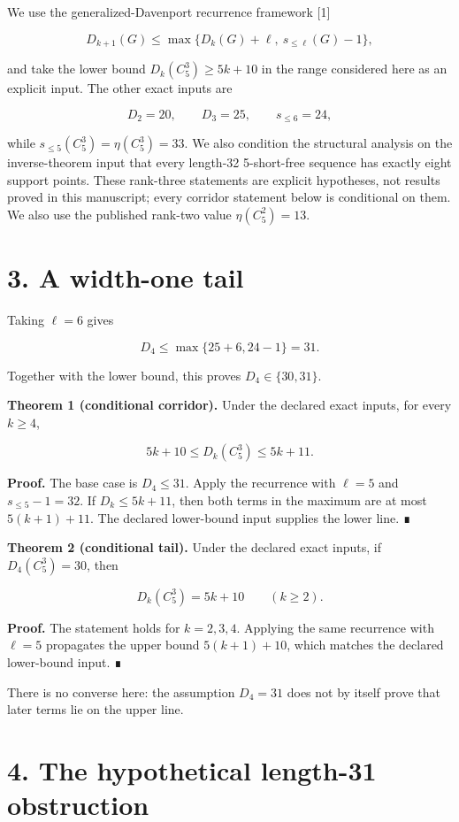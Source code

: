 \documentclass[
  11pt,
]{article}
\begin{document}
We use the generalized-Davenport recurrence framework {[}1{]}

\[
D_{k+1}(G)
\le\max\{D_k(G)+\ell, \ s_{\le\ell}(G)-1\},
\]

and take the lower bound \(D_k(C_5^3)\ge5k+10\) in the range considered
here as an explicit input. The other exact inputs are

\[
D_2=20, \qquad D_3=25, \qquad s_{\le6}=24,
\]

while \(s_{\le5}(C_5^3)=\eta(C_5^3)=33\). We also condition the
structural analysis on the inverse-theorem input that every length-32
5-short-free sequence has exactly eight support points. These rank-three
statements are explicit hypotheses, not results proved in this
manuscript; every corridor statement below is conditional on them. We
also use the published rank-two value \(\eta(C_5^2)=13\).

\hypertarget{a-width-one-tail}{%
\section{3. A width-one tail}\label{a-width-one-tail}}

Taking \(\ell=6\) gives

\[
D_4\le\max\{25+6,24-1\}=31.
\]

Together with the lower bound, this proves \(D_4\in\{30,31\}\).

\textbf{Theorem 1 (conditional corridor).} Under the declared exact
inputs, for every \(k\ge4\),

\[
5k+10\le D_k(C_5^3)\le5k+11.
\]

\textbf{Proof.} The base case is \(D_4\le31\). Apply the recurrence with
\(\ell=5\) and \(s_{\le5}-1=32\). If \(D_k\le5k+11\), then both terms in
the maximum are at most \(5(k+1)+11\). The declared lower-bound input
supplies the lower line. ∎

\textbf{Theorem 2 (conditional tail).} Under the declared exact inputs,
if \(D_4(C_5^3)=30\), then

\[
D_k(C_5^3)=5k+10
\qquad(k\ge2).
\]

\textbf{Proof.} The statement holds for \(k=2,3,4\). Applying the same
recurrence with \(\ell=5\) propagates the upper bound \(5(k+1)+10\),
which matches the declared lower-bound input. ∎

There is no converse here: the assumption \(D_4=31\) does not by itself
prove that later terms lie on the upper line.

\hypertarget{the-hypothetical-length-31-obstruction}{%
\section{4. The hypothetical length-31
obstruction}\label{the-hypothetical-length-31-obstruction}}
\end{document}
